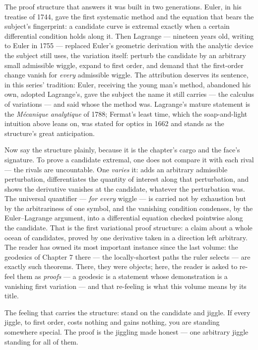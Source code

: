 The proof structure that answers it was built in two generations. Euler,
in his treatise of 1744, gave the first systematic method and the
equation that bears the subject's fingerprint: a candidate curve is
extremal exactly when a certain differential condition holds along it.
Then Lagrange --- nineteen years old, writing to Euler in 1755 ---
replaced Euler's geometric derivation with the analytic device the
subject still uses, the variation itself: perturb the candidate by an
arbitrary small admissible wiggle, expand to first order, and demand
that the first-order change vanish for \emph{every} admissible wiggle.
The attribution deserves its sentence, in this series' tradition: Euler,
receiving the young man's method, abandoned his own, adopted Lagrange's,
gave the subject the name it still carries --- the calculus of
variations --- and said whose the method was. Lagrange's mature
statement is the \emph{M\'ecanique analytique} of 1788; Fermat's least
time, which the soap-and-light intuition above leans on, was stated for
optics in 1662 and stands as the structure's great anticipation.

Now say the structure plainly, because it is the chapter's cargo and the
face's signature. To prove a candidate extremal, one does not compare it
with each rival --- the rivals are uncountable. One \emph{varies} it:
adds an arbitrary admissible perturbation, differentiates the quantity
of interest along that perturbation, and shows the derivative vanishes
at the candidate, whatever the perturbation was. The universal
quantifier --- \emph{for every} wiggle --- is carried not by exhaustion
but by the arbitrariness of one symbol, and the vanishing condition
condenses, by the Euler--Lagrange argument, into a differential
equation checked pointwise along the candidate. That is the first
variational proof structure: a claim about a whole ocean of candidates,
proved by one derivative taken in a direction left arbitrary. The reader
has owned its most important instance since the last volume: the
geodesics of Chapter 7 there --- the locally-shortest paths the ruler
selects --- are exactly such theorems. There, they were objects; here,
the reader is asked to re-feel them as \emph{proofs} --- a geodesic is a
statement whose demonstration is a vanishing first variation --- and
that re-feeling is what this volume means by its title.

\begin{intuition}
The feeling that carries the structure: stand on the candidate and
jiggle. If every jiggle, to first order, costs nothing and gains
nothing, you are standing somewhere special. The proof is the jiggling
made honest --- one arbitrary jiggle standing for all of them.
\end{intuition}

